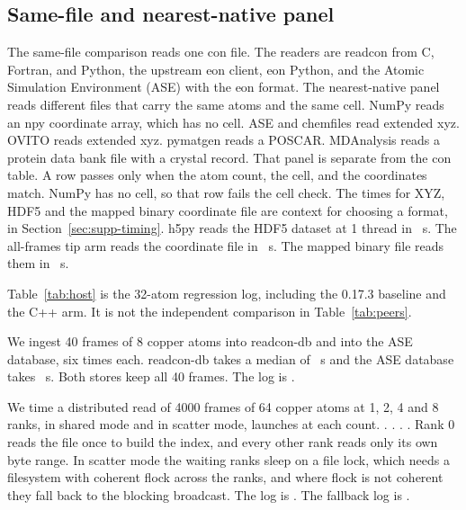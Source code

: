 \documentclass[preprint,12pt]{elsarticle}
\begin{document}
\subsection{Same-file and nearest-native panel}\label{sec:h2h} The
same-file comparison reads one con file.
The readers are readcon from C, Fortran, and Python, the upstream eon
client, eon Python, and the Atomic Simulation Environment (ASE) with the
eon format.
The nearest-native panel reads different files that carry the same atoms
and the same cell.
NumPy reads an npy coordinate array, which has no cell.
ASE and chemfiles read extended xyz.
OVITO reads extended xyz.
pymatgen reads a POSCAR.
MDAnalysis reads a protein data bank file with a crystal record.
That panel is separate from the con table.
A row passes only when the atom count, the cell, and the coordinates
match.
NumPy has no cell, so that row fails the cell check.
The times for XYZ, HDF5 and the mapped binary coordinate file are
context for choosing a format, in Section~\ref*{sec:supp-timing}.
h5py reads the HDF5 dataset at 1 thread in \rcHdfMedian~s.
The all-frames tip arm reads the coordinate file in \rcTipMedian~s.
The mapped binary file reads them in \rcConbinMedian~s.

Table~\ref{tab:host} is the 32-atom regression log, including the 0.17.3
baseline and the C++ arm.
It is not the independent comparison in Table~\ref{tab:peers}.


We ingest 40 frames of 8 copper atoms into readcon-db and into the ASE
database, six times each.
readcon-db takes a median of \rcDbIngestMedian~s and the ASE database
takes \rcAseDbMedian~s.
Both stores keep all 40 frames.
The log is .



We time a distributed read of 4000 frames of 64 copper atoms at 1, 2, 4
and 8 ranks, in shared mode and in scatter mode, \mpiRepeats{} launches
at each count.
\mpiSharedLine.
\mpiScatterLine.
\mpiCompareLine.
\mpiScatterIqrLine.
Rank 0 reads the file once to build the index, and every other rank
reads only its own byte range.
In scatter mode the waiting ranks sleep on a file lock, which needs a
filesystem with coherent flock across the ranks, and where flock is not
coherent they fall back to the blocking broadcast.
The log is .
The fallback log is .
\end{document}
